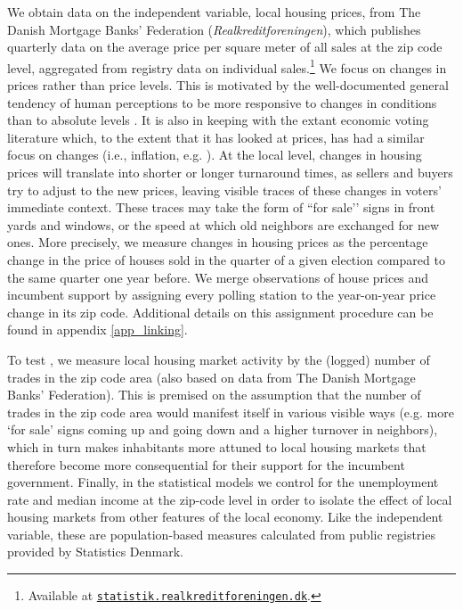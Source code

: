 \documentclass[12pt,a4paper]{article}
\begin{document}
	We obtain data on the independent variable, local housing prices, from The Danish Mortgage Banks' Federation (\textit{Realkreditforeningen}), which publishes quarterly data on the average price per square meter of all sales at the zip code level, aggregated from registry data on individual sales.\footnote{Available at \texttt{\href{http://statistik.realkreditforeningen.dk/}{statistik.realkreditforeningen.dk}}.} We focus on changes in prices rather than price levels. This is motivated by the well-documented general tendency of human perceptions to be more responsive to changes in conditions than to absolute levels \citep{kahneman1979prospect}. It is also in keeping with the extant economic voting literature which, to the extent that it has looked at prices, has had a similar focus on changes (i.e., inflation, e.g. \citealp{kramer1971short}). At the local level, changes in housing prices will translate into shorter or longer turnaround times, as sellers and buyers try to adjust to the new prices, leaving visible traces of these changes in voters’ immediate context. These traces may take the form of ``for sale’’ signs in front yards and windows, or the speed at which old neighbors are exchanged for new ones. More precisely, we measure changes in housing prices as the percentage change in the price of houses sold in the quarter of a given election compared to the same quarter one year before. We merge observations of house prices and incumbent support by assigning every polling station to the year-on-year price change in its zip code. Additional details on this assignment procedure can be found in appendix \ref{app_linking}.
	
	To test \htwo, we measure local housing market activity by the (logged) number of trades in the zip code area (also based on data from The Danish Mortgage Banks' Federation). This is premised on the assumption that the number of trades in the zip code area would manifest itself in various visible ways (e.g. more ‘for sale’ signs coming up and going down and a higher turnover in neighbors), which in turn makes inhabitants more attuned to local housing markets that therefore become more consequential for their support for the incumbent government.
	Finally, in the statistical models we control for the unemployment rate and median income at the zip-code level in order to isolate the effect of local housing markets from other features of the local economy. Like the independent variable, these are population-based measures calculated from public registries provided by Statistics Denmark.
	
\end{document}

